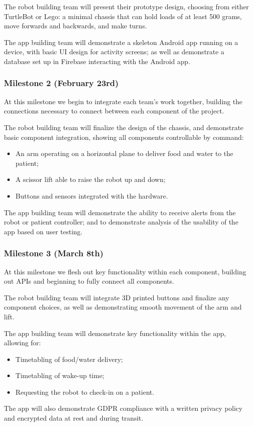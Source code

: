 \documentclass{article}
\begin{document}
The robot building team will present their prototype design, choosing from either TurtleBot or Lego: a minimal chassis that can hold loads of at least 500 grams, move forwards and backwards, and make turns.

The app building team will demonstrate a skeleton Android app running on a device, with basic UI design for activity screens; as well as demonstrate a database set up in Firebase interacting with the Android app. 

\subsubsection{Milestone 2 (February 23rd)}
At this milestone we begin to integrate each team's work together, building the connections necessary to connect between each component of the project. 

The robot building team will finalize the design of the chassis, and demonstrate basic component integration, showing all components controllable by command:
\begin{itemize}
\item An arm operating on a horizontal plane to deliver food and water to the patient;
\item A scissor lift able to raise the robot up and down;
\item Buttons and sensors integrated with the hardware.
\end{itemize}

The app building team will demonstrate the ability to receive alerts from the robot or patient controller; and to demonstrate analysis of the usability of the app based on user testing. 

\subsubsection{Milestone 3 (March 8th)}
At this milestone we flesh out key functionality within each component, building out APIs and beginning to fully connect all components. 

The robot building team will integrate 3D printed buttons and finalize any component choices, as well as demonstrating smooth movement of the arm and lift. 


The app building team will demonstrate key functionality within the app, allowing for:
\begin{itemize}
\item Timetabling of food/water delivery;
\item Timetabling of wake-up time;
\item Requesting the robot to check-in on a patient.
\end{itemize}
The app will also demonstrate GDPR compliance with a written privacy policy and encrypted data at rest and during transit.
\end{document}
